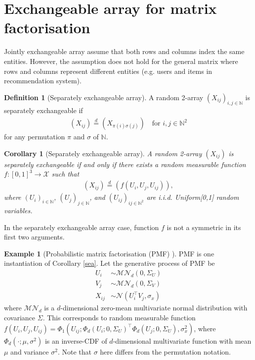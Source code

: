 \documentclass{article}
\newtheorem{corollary}{Corollary}[theorem] %
\theoremstyle{definition}
\newtheorem{definition}{Definition}
\newtheorem{example}{Example}[definition]
\begin{document}
\section{Exchangeable array for matrix factorisation}
Jointly exchangeable array assume that both rows and columns index the same entities. However, the assumption does not hold for the general matrix where rows and columns represent different entities (e.g. users and items in recommendation system).

\begin{definition}[Separately exchangeable array]A random 2-array $(X_{ij})_{i,j\in \mathbb{N}}$ is separately exchangeable if
\begin{align}
(X_{ij}) \stackrel{d}{=} (X_{\pi(i)\sigma(j)}) \quad \text{for } i,j \in \mathbb{N}^2
\end{align}
for any permutation $\pi$ and $\sigma$ of $\mathbb{N}$.
\end{definition}

\begin{corollary}[\label{sea}Separately exchangeable array] A random 2-array $(X_{ij})$ is separately exchangeable if and only if there exists a random measurable function $f:[0,1]^3 \rightarrow \mathcal{X}$ such that
\begin{align}
(X_{ij})  \stackrel{d}{=} (f(U_i, U_j, U_{ij})),
\end{align}
where $(U_i)_{i\in \mathbb{N}}$, $(U_j)_{j\in \mathbb{N}}$, and $(U_{ij})_{ij\in \mathbb{N}^2}$ are i.i.d. Uniform[0,1] random variables.
\end{corollary}
In the separately exchangeable array case, function $f$ is not a symmetric in its first two arguments.

\begin{example}[Probabilistic matrix factorisation (PMF) \citep{Salakhutdinov2008}] 
PMF is one instantiation of Corollary \ref{sea}. Let the generative process of PMF be
\begin{align}
U_i &\sim \mathcal{MN}_d(0, \Sigma_U)\\
V_j &\sim \mathcal{MN}_d(0, \Sigma_V)\\
X_{ij} &\sim \mathcal{N}(U_i^\top V_j, \sigma_x)
\end{align}
where $\mathcal{MN}_d$ is a $d$-dimensional zero-mean multivariate normal distribution with covariance $\Sigma$. This corresponds to random measurable function
$f(U_i, U_j, U_{ij}) = \Phi_1(U_{ij}; \Phi_d(U_i;0, \Sigma_{U})^\top \Phi_d(U_j;0, \Sigma_{U}), \sigma^2_x)$, where $\Phi_d(\cdot;\mu, \sigma^2)$ is an inverse-CDF of $d$-dimensional multivariate function with mean $\mu$ and variance $\sigma^2$. Note that $\sigma$ here differs from the permutation notation.
\end{example}
\end{document}
